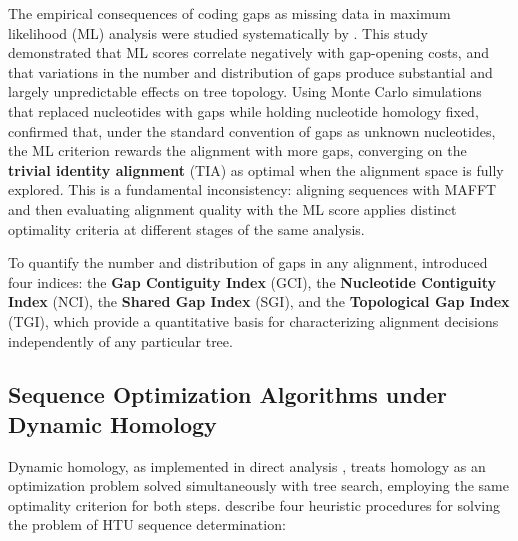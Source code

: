 The empirical consequences of coding gaps as missing data in maximum likelihood (ML) analysis were studied systematically by \textcite{jacobmachado2021c}. This study demonstrated that ML scores correlate negatively with gap-opening costs, and that variations in the number and distribution of gaps produce substantial and largely unpredictable effects on tree topology. Using Monte Carlo simulations that replaced nucleotides with gaps while holding nucleotide homology fixed, \textcite{jacobmachado2021c} confirmed that, under the standard convention of gaps as unknown nucleotides, the ML criterion rewards the alignment with more gaps, converging on the \textbf{trivial identity alignment} (TIA) as optimal when the alignment space is fully explored. This is a fundamental inconsistency: aligning sequences with MAFFT and then evaluating alignment quality with the ML score applies distinct optimality criteria at different stages of the same analysis.

To quantify the number and distribution of gaps in any alignment, \textcite{jacobmachado2021c} introduced four indices: the \textbf{Gap Contiguity Index} (GCI), the \textbf{Nucleotide Contiguity Index} (NCI), the \textbf{Shared Gap Index} (SGI), and the \textbf{Topological Gap Index} (TGI), which provide a quantitative basis for characterizing alignment decisions independently of any particular tree.

\subsection{Sequence Optimization Algorithms under Dynamic Homology}

Dynamic homology, as implemented in direct analysis \parencite{wheeler1996}, treats homology as an optimization problem solved simultaneously with tree search, employing the same optimality criterion for both steps. \textcite{wheeleretal2006} describe four heuristic procedures for solving the problem of HTU sequence determination:

